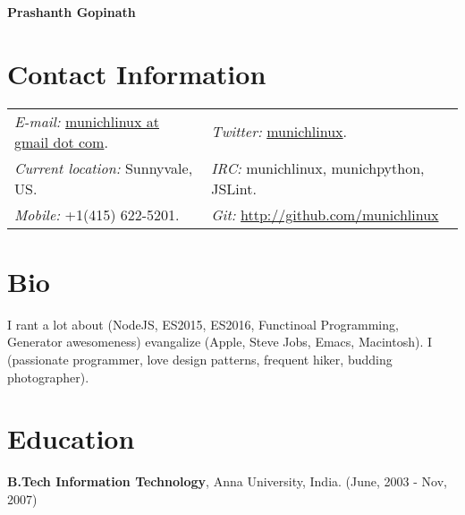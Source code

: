 \documentclass[margin, line, 10pt]{res}
\begin{document}
 \textbf{\LARGE Prashanth Gopinath}
\vspace{.15cm} \\
\vspace{-.05cm}
\begin{resume}

\section{Contact Information}
\vspace{.05in}
\vspace{.05in}
\begin{tabular}{@{}p{3in}p{3in}}
{\it E-mail:} \href{mailto:munichlinux@gmail.com}{munichlinux at gmail dot com}. & {\it Twitter:} \href{http://twitter.com/munichlinux}{munichlinux}. \\
{\it Current location:} Sunnyvale, US. & {\it IRC:} munichlinux, munichpython, JSLint.\\
{\it Mobile:}  +1(415) 622-5201. & {\it Git:} \href{http://github.com/munichlinux}{http://github.com/munichlinux}
\end{tabular}

\section{Bio}

I rant a lot about (NodeJS, ES2015, ES2016, Functinoal Programming, Generator awesomeness) evangalize (Apple, Steve Jobs, Emacs, Macintosh). I (passionate programmer, love design patterns, frequent hiker, budding photographer).

\section{Education}
{\bf B.Tech Information Technology}, Anna University, India. \hfill (June, 2003 - Nov, 2007)


\end{resume}
\end{document}
